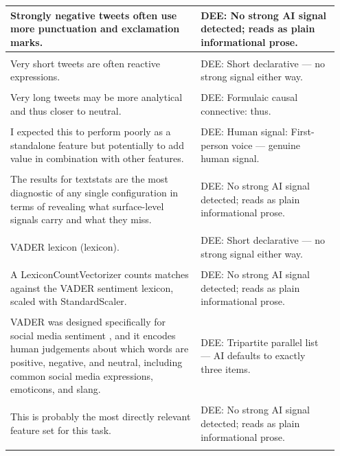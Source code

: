 \documentclass[11pt]{article}
\begin{document}
\begin{longtable}{|p{0.55\linewidth}|p{0.40\linewidth}|}
\hline
Strongly negative tweets often use more punctuation and exclamation marks. & DEE: No strong AI signal detected; reads as plain informational prose. \\[2pt]
\hline
\rule{0pt}{3.5cm} & \\
\hline
Very short tweets are often reactive expressions. & DEE: Short declarative --- no strong signal either way. \\[2pt]
\hline
\rule{0pt}{3.5cm} & \\
\hline
Very long tweets may be more analytical and thus closer to neutral. & DEE: Formulaic causal connective: thus. \\[2pt]
\hline
\rule{0pt}{3.5cm} & \\
\hline
I expected this to perform poorly as a standalone feature but potentially to add value in combination with other features. & DEE: Human signal: First-person voice --- genuine human signal. \\[2pt]
\hline
\rule{0pt}{3.5cm} & \\
\hline
The results for textstats are the most diagnostic of any single configuration in terms of revealing what surface-level signals carry and what they miss. & DEE: No strong AI signal detected; reads as plain informational prose. \\[2pt]
\hline
\rule{0pt}{3.5cm} & \\
\hline
VADER lexicon (lexicon). & DEE: Short declarative --- no strong signal either way. \\[2pt]
\hline
\rule{0pt}{3.5cm} & \\
\hline
A LexiconCountVectorizer counts matches against the VADER sentiment lexicon, scaled with StandardScaler. & DEE: No strong AI signal detected; reads as plain informational prose. \\[2pt]
\hline
\rule{0pt}{3.5cm} & \\
\hline
VADER was designed specifically for social media sentiment , and it encodes human judgements about which words are positive, negative, and neutral, including common social media expressions, emoticons, and slang. & DEE: Tripartite parallel list --- AI defaults to exactly three items. \\[2pt]
\hline
\rule{0pt}{3.5cm} & \\
\hline
This is probably the most directly relevant feature set for this task. & DEE: No strong AI signal detected; reads as plain informational prose. \\[2pt]
\hline
\rule{0pt}{3.5cm} & \\
\hline

\end{longtable}
\end{document}

